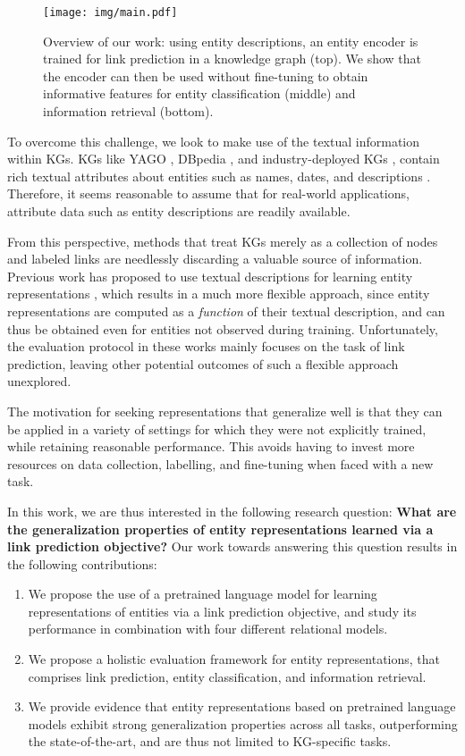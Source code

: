 \documentclass[sigconf]{acmart}
\begin{document}
\begin{figure}[t]
\centering
\texttt{[image: img/main.pdf]}
\caption{Overview of our work: using entity descriptions, an entity encoder is trained for link prediction in a knowledge graph (top). We show that the encoder can then be used without fine-tuning to obtain informative features for entity classification (middle) and information retrieval (bottom).}
\label{fig:model}
\end{figure}

To overcome this challenge, we look to make use of the textual information within KGs. KGs like YAGO \citep{suchanek2007yago}, DBpedia \citep{auer2007dbpedia}, and industry-deployed KGs \citep{dong2014knowledge,noy2019industry}, contain rich textual attributes about entities such as names, dates, and descriptions \citep{fensel2020knowledge}.  Therefore, it seems reasonable to assume that for real-world applications, attribute data such as entity descriptions are readily available.

From this perspective, methods that treat KGs merely as a collection of nodes and labeled links are needlessly discarding a valuable source of information. Previous work has proposed to use textual descriptions for learning entity representations \cite{shi2018open,yao2019kg,xie2016RepresentationLO,wang2019kepler}, which results in a much more flexible approach, since entity representations are computed as a \emph{function} of their textual description, and can thus be obtained even for entities not observed during training. Unfortunately, the evaluation protocol in these works mainly focuses on the task of link prediction, leaving other potential outcomes of such a flexible approach unexplored.

The motivation for seeking representations that generalize well is that they can be applied in a variety of settings for which they were not explicitly trained, while retaining reasonable performance. This avoids having to invest more resources on data collection, labelling, and fine-tuning when faced with a new task.

In this work, we are thus interested in the following research question: \textbf{What are the generalization properties of entity representations learned via a link prediction objective?}
Our work towards answering this question results in the following contributions:

\begin{enumerate}
\item We propose the use of a pretrained language model for learning representations of entities via a link prediction objective, and study its performance in combination with four different relational models.
\item We propose a holistic evaluation framework for entity representations, that comprises link prediction, entity classification, and information retrieval.
\item We provide evidence that entity representations based on pretrained language models exhibit strong generalization properties across all tasks, outperforming the state-of-the-art, and are thus not limited to KG-specific tasks.
\end{enumerate}
\end{document}
